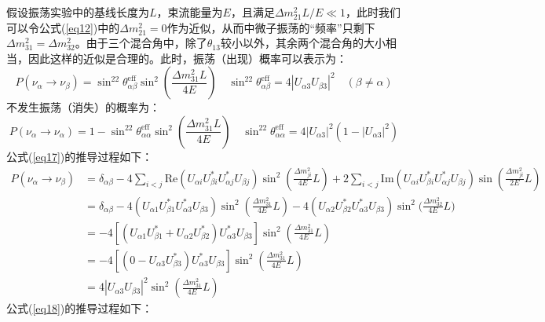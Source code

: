 \documentclass{article}
\begin{document}
		假设振荡实验中的基线长度为$L$，束流能量为$E$，且满足$\Delta m_{21}^2L/E\ll1$，此时我们可以令公式(\ref{eq12})中的$\Delta m_{21}^2=0$作为近似，从而中微子振荡的“频率”只剩下$\Delta m_{31}^2=\Delta m_{32}^2$。由于三个混合角中，除了$\theta_{13}$较小以外，其余两个混合角的大小相当，因此这样的近似是合理的。此时，振荡（出现）概率可以表示为\cite{de1980fresh}\cite{Barger1980}：
		\begin{equation}
			P(\nu_\alpha\to\nu_\beta)=\sin^22\theta^\mathrm{eff}_{\alpha\beta}\sin^2\left(\frac{\Delta m_{31}^2L}{4E}\right)\quad \sin^22\theta^\mathrm{eff}_{\alpha\beta}=4|U_{\alpha3}U_{\beta3}|^2\quad (\beta\ne\alpha)
			\label{eq17}
		\end{equation}
		不发生振荡（消失）的概率为：
		\begin{equation}
			P(\nu_\alpha\to\nu_\alpha)=1-\sin^22\theta^\mathrm{eff}_{\alpha\alpha}\sin^2\left(\frac{\Delta m_{31}^2L}{4E}\right)\quad \sin^22\theta^\mathrm{eff}_{\alpha\alpha}=4|U_{\alpha3}|^2(1-|U_{\alpha 3}|^2)
			\label{eq18}
		\end{equation}
		公式(\ref{eq17})的推导过程如下：
		\begin{equation*}
			\begin{aligned}
				P(\nu_\alpha\to\nu_\beta)&=\delta_{\alpha\beta}-4\sum_{i<j}\mathrm{Re}(U_{\alpha i}U_{\beta i}^\ast U_{\alpha j}^\ast U_{\beta j})\sin^2\left(\frac{\Delta m_{ji}^2}{4E}L\right)+2\sum_{i<j}\mathrm{Im}(U_{\alpha i}U_{\beta i}^\ast U_{\alpha j}^\ast U_{\beta j})\sin\left(\frac{\Delta m_{ji}^2}{2E}L\right)\\
				&=\delta_{\alpha\beta}-4(U_{\alpha 1}U_{\beta 1}^\ast U_{\alpha 3}^\ast U_{\beta 3})\sin^2\left(\frac{\Delta m_{31}^2}{4E}L\right)-4(U_{\alpha 2}U_{\beta 2}^\ast U_{\alpha 3}^\ast U_{\beta 3})\sin^2\Big(\frac{\Delta m_{32}^2}{4E}L\Big)\\
				&=-4[(U_{\alpha1}U_{\beta1}^\ast+U_{\alpha2}U_{\beta2}^\ast)U_{\alpha3}^\ast U_{\beta3}]\sin^2\left(\frac{\Delta m_{31}^2}{4E}L\right)\\
				&=-4[(0-U_{\alpha3}U_{\beta3}^\ast)U_{\alpha3}^\ast U_{\beta3}]\sin^2\left(\frac{\Delta m_{31}^2}{4E}L\right)\\
				&=4|U_{\alpha3}U_{\beta3}|^2\sin^2\left(\frac{\Delta m_{31}^2}{4E}L\right)
			\end{aligned}
		\end{equation*}
		公式(\ref{eq18})的推导过程如下：
\end{document}
